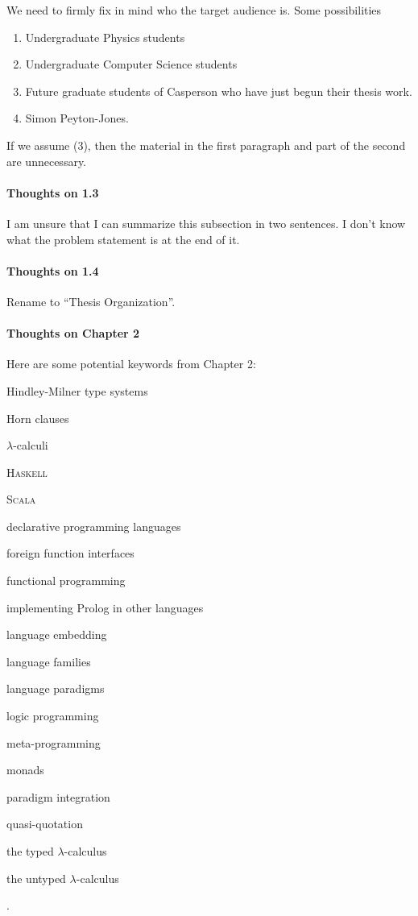 \begin{scope}
We need to firmly fix in mind who the target audience is.  Some
possibilities
\begin{enumerate}
\item Undergraduate Physics students
\item Undergraduate Computer Science students
\item
  Future graduate students of Casperson who have just begun their
  thesis work.
\item
  Simon Peyton-Jones.
\end{enumerate}
If we assume (3), then the material in the first paragraph and part of
the second are unnecessary.

\paragraph{Thoughts on 1.3}

I am unsure that I can summarize this subsection in two sentences.  I
don't know what the problem statement is at the end of it.

\paragraph{Thoughts on 1.4}

Rename to ``Thesis Organization''.

\paragraph{Thoughts on Chapter 2}

Here are some potential keywords from Chapter 2:
\begin{inparaitem}
\item Hindley-Milner type systems
\item Horn clauses
\item \(\lambda\)-calculi
\item \textsc{Haskell}
\item \textsc{Scala}
\item declarative programming languages
\item foreign function interfaces
\item functional programming
\item implementing Prolog in other languages
\item language embedding
\item language families
\item language paradigms
\item logic programming
\item meta-programming
\item monads
\item paradigm integration
\item quasi-quotation
\item the typed \(\lambda\)-calculus
\item the untyped \(\lambda\)-calculus
\end{inparaitem}.


\end{scope}
